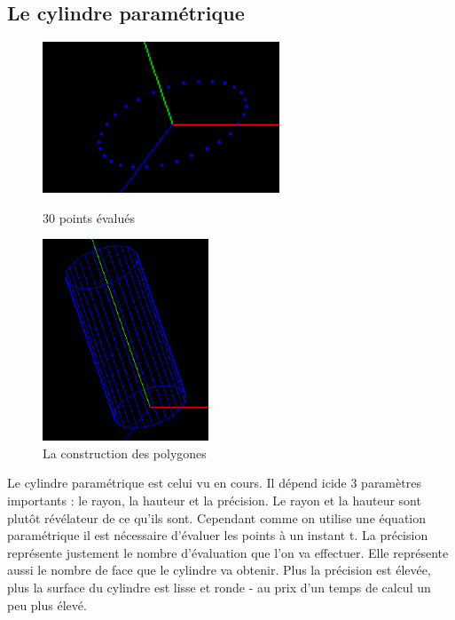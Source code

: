 \documentclass{article}
\begin{document}
\subsection{Le cylindre paramétrique}

\begin{figure}[!htb]
	\begin{minipage}{0.5\textwidth}
    	\centering
    	\includegraphics[height=4.5cm]{./assets/cylindre_para_0.png}
		\caption{30 points évalués}
    	\label{fig:cylindre_para_0}
	\end{minipage}
	\hfill
	\begin{minipage}{0.5\textwidth}
    	\centering
    	\includegraphics[height=6cm]{./assets/cylindre_para_1.png}
    	\caption{La construction des polygones}
    	\label{fig:cylindre_para_1}
	\end{minipage}
\end{figure}
\newpage
Le cylindre paramétrique est celui vu en cours. Il dépend icide 3 paramètres importants : le rayon, la hauteur et la précision. Le rayon et la hauteur sont plutôt révélateur de ce qu'ils sont. Cependant comme on utilise une équation paramétrique il est nécessaire d'évaluer les points à un instant t. La précision représente justement le nombre d'évaluation que l'on va effectuer. Elle représente aussi le nombre de face que le cylindre va obtenir. Plus la précision est élevée, plus la surface du cylindre est lisse et ronde - au prix d'un temps de calcul un peu plus élevé.\\~\\
\end{document}

